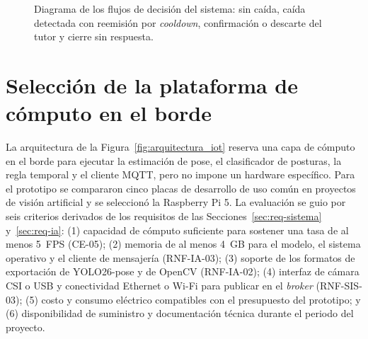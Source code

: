 \documentclass[12pt,a4paper,oneside]{book}
\theoremstyle{plain}
\theoremstyle{definition}
\theoremstyle{remark}
\begin{document}
\begin{figure}[H]
{}
\caption{Diagrama de los flujos de decisión del sistema: sin caída, caída detectada con reemisión por \textit{cooldown}, confirmación o descarte del tutor y cierre sin respuesta.}
\label{fig:flujos_alerta}
\end{figure}


\section{Selección de la plataforma de cómputo en el borde}
\label{sec:seleccion-placa}

La arquitectura de la Figura~\ref{fig:arquitectura_iot} reserva una capa de cómputo en el borde para ejecutar la estimación de pose, el clasificador de posturas, la regla temporal y el cliente MQTT, pero no impone un hardware específico. Para el prototipo se compararon cinco placas de desarrollo de uso común en proyectos de visión artificial y se seleccionó la Raspberry Pi 5. La evaluación se guio por seis criterios derivados de los requisitos de las Secciones~\ref{sec:req-sistema} y~\ref{sec:req-ia}: (1) capacidad de cómputo suficiente para sostener una tasa de al menos 5~FPS (CE-05); (2) memoria de al menos 4~GB para el modelo, el sistema operativo y el cliente de mensajería (RNF-IA-03); (3) soporte de los formatos de exportación de YOLO26-pose y de OpenCV \parencite{bradski2000opencv} (RNF-IA-02); (4) interfaz de cámara CSI o USB y conectividad Ethernet o Wi-Fi para publicar en el \textit{broker} (RNF-SIS-03); (5) costo y consumo eléctrico compatibles con el presupuesto del prototipo; y (6) disponibilidad de suministro y documentación técnica durante el periodo del proyecto.
\end{document}
